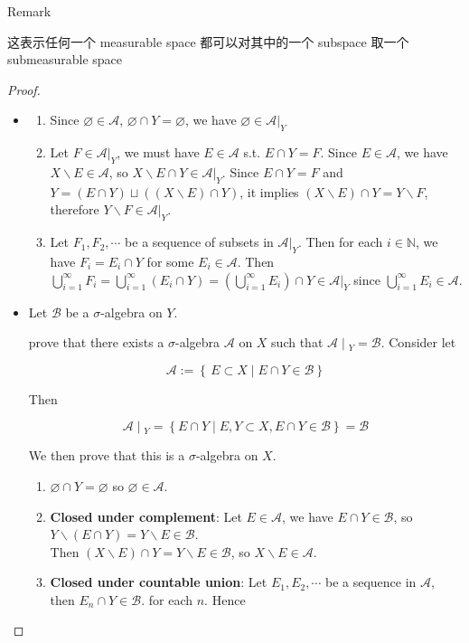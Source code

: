 \documentclass{qlnotes-export}
\begin{document}
\begin{qlremark}{Remark}

这表示任何一个 measurable space 都可以对其中的一个 subspace 取一个 submeasurable space

\end{qlremark}

\begin{proof}

\begin{itemize}
\item
  \begin{enumerate}
  \item
    Since \(\varnothing \in \mathcal{A}\), \(\varnothing \cap Y = \varnothing\), we have \(\varnothing \in \mathcal{A}|_{Y}\)
  \item
    Let \(F \in \mathcal{A}|_{Y}\), we must have \(E \in \mathcal{A}\) s.t. \(E \cap Y = F\). Since \(E \in \mathcal{A}\), we have \(X\backslash E \in \mathcal{A}\), so \(X\backslash E \cap Y \in \mathcal{A}|_{Y}\). Since \(E \cap Y = F\) and \(Y = (E \cap Y) \sqcup ((X\backslash E) \cap Y)\), it implies \((X\backslash E) \cap Y = Y\backslash F\), therefore \(Y\backslash F \in \mathcal{A}|_{Y}\).
  \item
    Let \(F_{1},F_{2},\cdots\) be a sequence of subsets in \(\mathcal{A}|_{Y}\). Then for each \(i \in {\mathbb{N}}\), we have \(F_{i} = E_{i} \cap Y\) for some \(E_{i} \in \mathcal{A}\). Then \(\bigcup_{i = 1}^{\infty}F_{i} = \bigcup_{i = 1}^{\infty}(E_{i} \cap Y) = (\bigcup_{i = 1}^{\infty}E_{i}) \cap Y \in \mathcal{A}|_{Y}\) since \(\bigcup_{i = 1}^{\infty}E_{i} \in \mathcal{A}\).
  \end{enumerate}
\item
  Let \(\mathcal{B}\) be a \(\sigma\)-algebra on \(Y\).

  prove that there exists a \(\sigma\)-algebra \(\mathcal{A}\) on \(X\) such that \(\left. \mathcal{A} \middle| {}_{Y} = \mathcal{B} \right.\). Consider let

  \[\mathcal{A} := \left\{ {\, E \subset X \mid E \cap Y \in \mathcal{B}} \right\}\]

  Then

  \[\left. \mathcal{A} \middle| {}_{Y} = \left\{ {E \cap Y \mid E,Y \subset X,E \cap Y \in \mathcal{B}} \right\} = \mathcal{B} \right.\]

  We then prove that this is a \(\sigma\)-algebra on \(X\).\\

  \begin{enumerate}
  \item
    \(\varnothing \cap Y = \varnothing\) so \(\varnothing \in \mathcal{A}\).
  \item
    \textbf{Closed under complement}: Let \(E \in \mathcal{A}\), we have \(E \cap Y \in \mathcal{B}\), so \(Y\backslash(E \cap Y) = Y\backslash E \in \mathcal{B}\).\\
    Then \((X\backslash E) \cap Y = Y\backslash E \in \mathcal{B}\), so \(X\backslash E \in \mathcal{A}\).
  \item
    \textbf{Closed under countable union}: Let \(E_{1},E_{2},\cdots\) be a sequence in \(\mathcal{A}\), then \(E_{n} \cap Y \in \mathcal{B}\). for each \(n\). Hence


\end{enumerate}
\end{itemize}
\end{proof}
\end{document}
